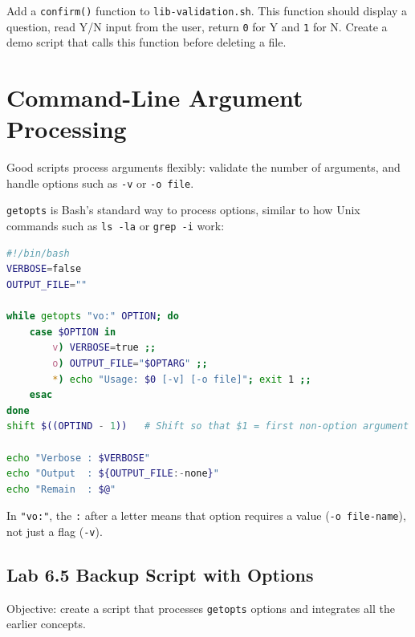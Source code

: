 \begin{exercisebox}[Exercise 7.4]
Add a \texttt{confirm()} function to \texttt{lib-validation.sh}. This
function should display a question, read Y/N input from the user, return
\texttt{0} for Y and \texttt{1} for N. Create a demo script that calls this
function before deleting a file.
\end{exercisebox}

\section{Command-Line Argument Processing}
\label{sec:argument-processing}

Good scripts process arguments flexibly: validate the number of arguments, and
handle options such as \texttt{-v} or \texttt{-o file}.

\texttt{getopts} is Bash's standard way to process options, similar to how
Unix commands such as \texttt{ls -la} or \texttt{grep -i} work:

\begin{lstlisting}[language=bash, caption={Basic getopts pattern}]
#!/bin/bash
VERBOSE=false
OUTPUT_FILE=""

while getopts "vo:" OPTION; do
    case $OPTION in
        v) VERBOSE=true ;;
        o) OUTPUT_FILE="$OPTARG" ;;
        *) echo "Usage: $0 [-v] [-o file]"; exit 1 ;;
    esac
done
shift $((OPTIND - 1))   # Shift so that $1 = first non-option argument

echo "Verbose : $VERBOSE"
echo "Output  : ${OUTPUT_FILE:-none}"
echo "Remain  : $@"
\end{lstlisting}

In \texttt{"vo:"}, the \texttt{:} after a letter means that option requires
a value (\texttt{-o file-name}), not just a flag (\texttt{-v}).

\subsection*{Lab 6.5 Backup Script with Options}

Objective: create a script that processes \texttt{getopts} options and
integrates all the earlier concepts.

